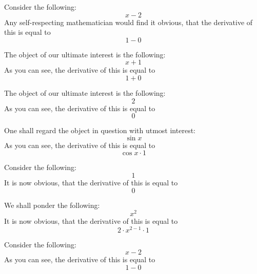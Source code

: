 \documentclass{article}
\begin{document}
Consider the following:
\begin{equation}
x - 2 
\end{equation}
Any self-respecting mathematician would find it obvious, that the derivative of this is equal to
\begin{equation}
1 - 0 
\end{equation}

The object of our ultimate interest is the following:
\begin{equation}
x + 1 
\end{equation}
As you can see, the derivative of this is equal to
\begin{equation}
1 + 0 
\end{equation}

The object of our ultimate interest is the following:
\begin{equation}
2 
\end{equation}
As you can see, the derivative of this is equal to
\begin{equation}
0 
\end{equation}

One shall regard the object in question with utmost interest:
\begin{equation}
\sin x 
\end{equation}
As you can see, the derivative of this is equal to
\begin{equation}
\cos x \cdot 1 
\end{equation}

Consider the following:
\begin{equation}
1 
\end{equation}
It is now obvious, that the derivative of this is equal to
\begin{equation}
0 
\end{equation}

We shall ponder the following:
\begin{equation}
x ^{2 } 
\end{equation}
It is now obvious, that the derivative of this is equal to
\begin{equation}
2 \cdot x ^{2 - 1 } \cdot 1 
\end{equation}

Consider the following:
\begin{equation}
x - 2 
\end{equation}
As you can see, the derivative of this is equal to
\begin{equation}
1 - 0 
\end{equation}
\end{document}
